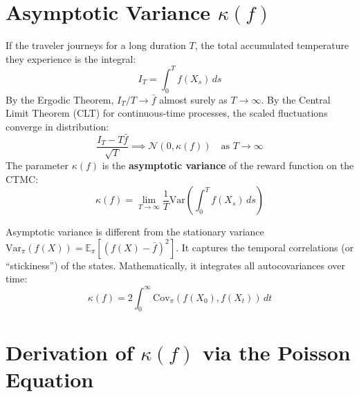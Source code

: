 \documentclass[11pt]{article}
\begin{document}
\section{Asymptotic Variance $\kappa(f)$}

If the traveler journeys for a long duration $T$, the total accumulated temperature they experience is the integral:
\begin{equation}
    I_T = \int_0^T f(X_s) \, ds
\end{equation}
By the Ergodic Theorem, $I_T/T \to \bar{f}$ almost surely as $T \to \infty$. By the Central Limit Theorem (CLT) for continuous-time processes, the scaled fluctuations converge in distribution:
\begin{equation}
    \frac{I_T - T\bar{f}}{\sqrt{T}} \implies \mathcal{N}(0, \kappa(f)) \quad \text{as } T \to \infty
\end{equation}
The parameter $\kappa(f)$ is the \textbf{asymptotic variance} of the reward function on the CTMC:
\begin{equation}
    \kappa(f) = \lim_{T \to \infty} \frac{1}{T} \text{Var}\left( \int_0^T f(X_s) \, ds \right)
\end{equation}

Asymptotic variance is different from the stationary variance $\text{Var}_\pi(f(X)) = \mathbb{E}_\pi[(f(X) - \bar{f})^2]$. It captures the temporal correlations (or ``stickiness'') of the states. Mathematically, it integrates all autocovariances over time:
\begin{equation}
    \kappa(f) = 2 \int_0^\infty \text{Cov}_\pi(f(X_0), f(X_t)) \, dt
\end{equation}

\section{Derivation of $\kappa(f)$ via the Poisson Equation}
\end{document}
